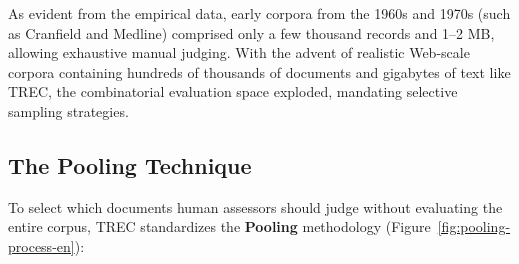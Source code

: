 \begin{table}[H]
\centering
{}
\caption{Comparative overview of classical historical evaluation test corpora.}
\label{tab:test-corpora-en}
\end{table}

As evident from the empirical data, early corpora from the 1960s and 1970s (such as Cranfield and Medline) comprised only a few thousand records and 1--2 MB, allowing exhaustive manual judging. With the advent of realistic Web-scale corpora containing hundreds of thousands of documents and gigabytes of text like TREC, the combinatorial evaluation space exploded, mandating selective sampling strategies.

\subsection{The Pooling Technique}
To select which documents human assessors should judge without evaluating the entire corpus, TREC standardizes the \textbf{Pooling} methodology (Figure~\ref{fig:pooling-process-en}):

